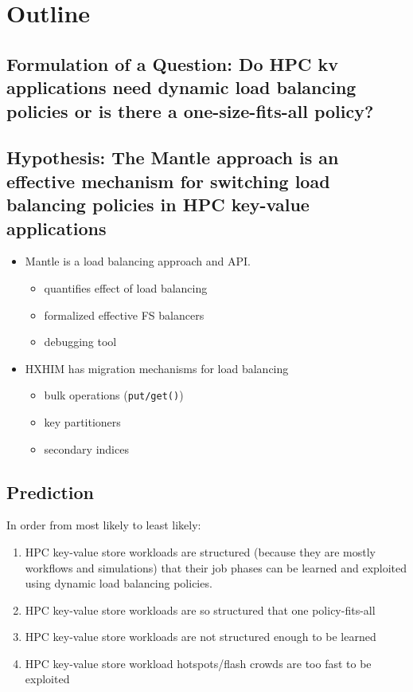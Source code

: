 \section{Outline}



\subsection{Formulation of a Question: Do HPC kv applications need dynamic load
balancing policies or is there a one-size-fits-all policy?}

\subsection{Hypothesis: The Mantle approach is an effective mechanism for
switching load balancing policies in HPC key-value applications}

\begin{itemize}
  \item Mantle is a load balancing approach and API.
  \begin{itemize}
    \item quantifies effect of load balancing
    \item formalized effective FS balancers
    \item debugging tool 
  \end{itemize}
  \item HXHIM has migration mechanisms for load balancing
  \begin{itemize}
    \item bulk operations (\texttt{put/get()})
    \item key partitioners
    \item secondary indices
  \end{itemize}
\end{itemize}

\subsection{Prediction}

In order from most likely to least likely:

\begin{enumerate}

  \item HPC key-value store workloads are structured (because they are mostly
  workflows and simulations) that their job phases can be learned and exploited
  using dynamic load balancing policies.

  \item HPC key-value store workloads are so structured that one
  policy-fits-all

  \item HPC key-value store workloads are not structured enough to be learned

  \item HPC key-value store workload hotspots/flash crowds are too fast to be
  exploited

\end{enumerate}


